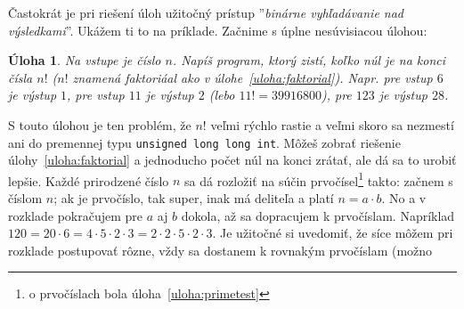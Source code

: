 \documentclass[10pt]{article}
\def\prg{\lstinline}
\newtheorem{uloha}{Úloha}
\begin{document}
Častokrát je pri riešení úloh užitočný prístup 
''{\em binárne vyhľadávanie nad výsledkami}''. Ukážem ti to na príklade. 
Začnime s úplne nesúvisiacou úlohou:

\begin{uloha}
  \label{uloha:nulyfaktorialu}
  Na vstupe je číslo $n$. Napíš program, ktorý zistí, koľko núl je na konci čísla
  $n!$ ($n!$ znamená faktoriáal ako v úlohe~\ref{uloha:faktorial}). 
  Napr. pre vstup $6$ je výstup $1$, pre vstup $11$ je výstup $2$ (lebo
  $11!=39916800$), pre $123$ je výstup $28$.
\end{uloha}

S touto úlohou je ten problém, že $n!$ veľmi rýchlo rastie a veľmi skoro sa nezmestí ani
do premennej typu \prg!unsigned long long int!. Môžeš zobrať riešenie 
úlohy~\ref{uloha:faktorial} a jednoducho počet núl na konci zrátať, ale
dá sa to urobiť lepšie. 
Každé prirodzené číslo $n$ sa dá rozložiť na súčin prvočísel\footnote{o prvočíslach bola 
úloha~\ref{uloha:primetest}} takto: začnem s číslom $n$; ak je prvočíslo, tak super,
inak má deliteľa a platí $n=a\cdot b$. No a v rozklade pokračujem pre $a$ aj $b$ dokola,
až sa dopracujem k prvočíslam. Napríklad $120=20\cdot6=4\cdot5\cdot2\cdot3=
2\cdot2\cdot5\cdot2\cdot3$. Je užitočné si uvedomiť, že síce môžem pri rozklade postupovať
rôzne, vždy sa dostanem k rovnakým prvočíslam (možno
\end{document}
